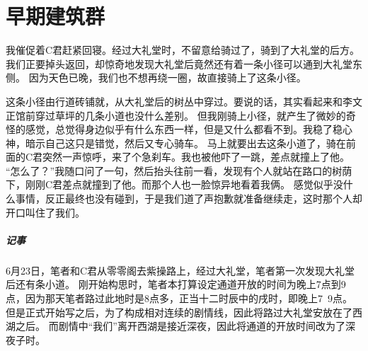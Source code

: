 \chapter{早期建筑群}

我催促着C君赶紧回寝。经过大礼堂时，不留意给骑过了，骑到了大礼堂的后方。
我们正要掉头返回，却惊奇地发现大礼堂后竟然还有着一条小径可以通到大礼堂东侧。
因为天色已晚，我们也不想再绕一圈，故直接骑上了这条小径。

这条小径由行道砖铺就，从大礼堂后的树丛中穿过。要说的话，其实看起来和李文正馆前穿过草坪的几条小道也没什么差别。
但我刚骑上小径，就产生了微妙的奇怪的感觉，总觉得身边似乎有什么东西一样，但是又什么都看不到。我稳了稳心神，暗示自己这只是错觉，然后又专心骑车。
马上就要出去这条小道了，骑在前面的C君突然一声惊呼，来了个急刹车。我也被他吓了一跳，差点就撞上了他。
“怎么了？”我随口问了一句，然后抬头往前一看，发现有个人就站在路口的树荫下，刚刚C君差点就撞到了他。而那个人也一脸惊异地看着我俩。
感觉似乎没什么事情，反正最终也没有碰到，于是我们道了声抱歉就准备继续走，这时那个人却开口叫住了我们。

\vfill

\paragraph{记事}
6月23日，笔者和C君从零零阁去紫操路上，经过大礼堂，笔者第一次发现大礼堂后还有条小道。
刚开始构思时，笔者本打算设定通道开放的时间为晚上7点到9点，因为那天笔者路过此地时是8点多，正当十二时辰中的戌时，即晚上7~9点。
但是正式开始写之后，为了构成相对连续的剧情线，因此将路过大礼堂安放在了西湖之后。
而剧情中“我们”离开西湖是接近深夜，因此将通道的开放时间改为了深夜子时。
